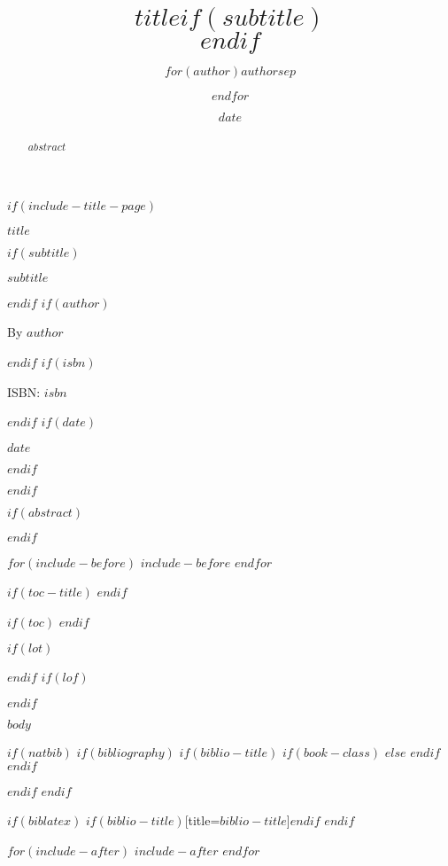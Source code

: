 \documentclass[$if(fontsize)$$fontsize$,$endif$$if(papersize)$$papersize$paper,$endif$$for(classoption)$$classoption$$sep$,$endfor$]{$documentclass$}
\title{$title$$if(subtitle)$\\\vspace{0.5em}{\large $subtitle$}$endif$}
\author{$for(author)$$author$$sep$ \and $endfor$}
\date{$date$}
\newcommand{\customtitlepage}{
  \begin{titlepage}
    \pagestyle{empty}
    \begin{center}
    \vspace*{2cm}
    {\Huge\bfseries $title$\par}
    $if(subtitle)$
    \vspace{0.5cm}
    {\Large $subtitle$\par}
    $endif$
    \vspace{2cm}
    $if(author)$
    {\large By $author$\par}
    $endif$
    $if(isbn)$
    \vspace{0.5cm}
    {\large ISBN: $isbn$\par}
    $endif$
    $if(date)$
    \vspace{1cm}
    {\large $date$\par}
    $endif$
    \end{center}
  \end{titlepage}
}
\begin{document}
\frontmatter
{}  %
\pagestyle{plain}      %

$if(include-title-page)$
\customtitlepage
$endif$

$if(abstract)$
\begin{abstract}
$abstract$
\end{abstract}
$endif$

$for(include-before)$
$include-before$
$endfor$

$if(toc-title)$
\renewcommand{\contentsname}{$toc-title$}
$endif$

$if(toc)$
{
\hypersetup{linkcolor=black}
\setcounter{tocdepth}{$if(toc-depth)$$toc-depth$$else$2$endif$}
\tableofcontents
\clearpage
}
$endif$

$if(lot)$
\listoftables
$endif$
$if(lof)$
\listoffigures
$endif$

$body$

$if(natbib)$
$if(bibliography)$
$if(biblio-title)$
$if(book-class)$
\renewcommand\bibname{$biblio-title$}
$else$
\renewcommand\refname{$biblio-title$}
$endif$
$endif$

$endif$
$endif$

$if(biblatex)$
\printbibliography$if(biblio-title)$[title=$biblio-title$]$endif$
$endif$

$for(include-after)$
$include-after$
$endfor$
\end{document}
